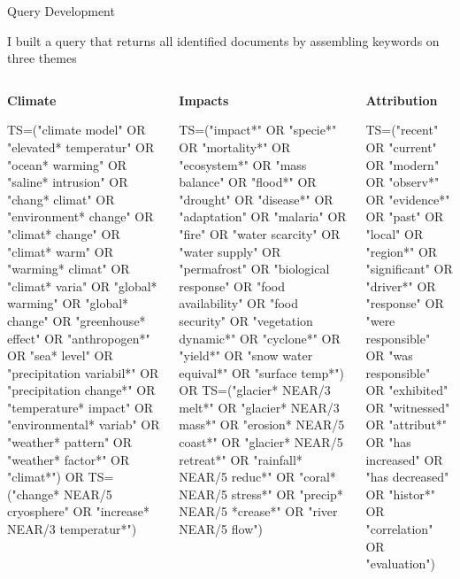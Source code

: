 \documentclass[9pt]{beamer}
\begin{document}
\begin{frame}{Query Development}

I built a query that returns all identified documents by assembling keywords on three themes

\medskip

\begin{columns}[t]
	\begin{column}{0.33\linewidth}
		\textbf{Climate}
		
		\scriptsize
		
		TS=("climate model" OR "elevated* temperatur" OR "ocean* warming" OR "saline* intrusion" OR "chang* climat" OR "environment* change" OR "climat* change" OR "climat* warm" OR "warming* climat" OR "climat* varia" OR "global* warming" OR "global* change" OR "greenhouse* effect" OR "anthropogen*" OR "sea* level" OR "precipitation variabil*" OR "precipitation change*" OR "temperature* impact" OR "environmental* variab" OR "weather* pattern" OR "weather* factor*" OR "climat*") OR TS=("change* NEAR/5  cryosphere" OR "increase* NEAR/3  temperatur*")
	\end{column}
	\begin{column}{0.33\linewidth}
		\textbf{Impacts}
		
		\scriptsize
		TS=("impact*" OR "specie*" OR "mortality*" OR "ecosystem*" OR "mass balance" OR "flood*" OR "drought" OR "disease*" OR "adaptation" OR "malaria" OR "fire" OR "water scarcity" OR "water supply" OR "permafrost" OR "biological response" OR "food availability" OR "food security" OR "vegetation dynamic*" OR "cyclone*" OR "yield*" OR "snow water equival*" OR "surface temp*") OR TS=("glacier* NEAR/3  melt*" OR "glacier* NEAR/3  mass*" OR "erosion* NEAR/5  coast*" OR "glacier* NEAR/5  retreat*" OR "rainfall* NEAR/5  reduc*" OR "coral* NEAR/5  stress*" OR "precip* NEAR/5  *crease*" OR "river NEAR/5  flow")
	\end{column}
	\begin{column}{0.33\linewidth}
		\textbf{Attribution}
		
		\scriptsize
		TS=("recent" OR "current" OR "modern" OR "observ*" OR "evidence*" OR "past" OR "local" OR "region*" OR "significant" OR "driver*" OR "response" OR "were responsible" OR "was responsible" OR "exhibited" OR "witnessed" OR "attribut*" OR "has increased" OR "has decreased" OR "histor*" OR "correlation" OR "evaluation")
	\end{column}
\end{columns}

\medskip



\end{frame}
\end{document}
